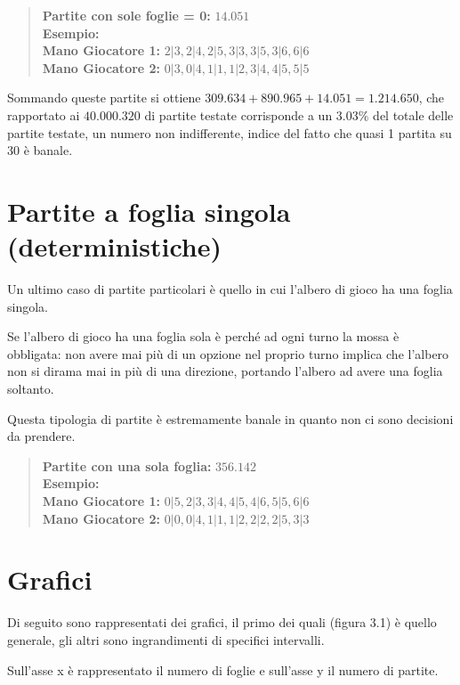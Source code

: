 \documentclass[a4paper,12pt]{report}
\begin{document}
\begin{quote}
    \textbf{Partite con sole foglie = 0:} \(14.051 \)\\
    \textbf{Esempio:} \(\)\\
    \textbf{Mano Giocatore 1:} \(2|3, 2|4, 2|5, 3|3, 3|5, 3|6, 6|6\)\\
    \textbf{Mano Giocatore 2:} \(0|3, 0|4, 1|1, 1|2, 3|4, 4|5, 5|5\)
\end{quote}

Sommando queste partite si ottiene \(309.634 + 890.965 + 14.051 = 1.214.650 \), che rapportato ai \( 40.000.320 \) di partite testate corrisponde a un \( 3.03 \% \) del totale delle partite testate, un numero non indifferente, indice del fatto che quasi 1 partita su 30 è banale.


\section{Partite a foglia singola (deterministiche)}

Un ultimo caso di partite particolari è quello in cui l'albero di gioco ha una foglia singola.

Se l'albero di gioco ha una foglia sola è perché ad ogni turno la mossa è obbligata: non avere mai più di un opzione nel proprio turno implica che l'albero non si dirama mai in più di una direzione, portando l'albero ad avere una foglia soltanto.

Questa tipologia di partite è estremamente banale in quanto non ci sono decisioni da prendere.

\begin{quote}
    \textbf{Partite con una sola foglia:} \(356.142\)\\
    \textbf{Esempio:} \(\)\\
    \textbf{Mano Giocatore 1:} \(0|5, 2|3, 3|4, 4|5, 4|6, 5|5, 6|6\)\\
    \textbf{Mano Giocatore 2:} \(0|0, 0|4, 1|1, 1|2, 2|2, 2|5, 3|3\)
\end{quote}


\section{Grafici}

Di seguito sono rappresentati dei grafici, il primo dei quali (figura 3.1) è quello generale, gli altri sono ingrandimenti di specifici intervalli.

Sull'asse x è rappresentato il numero di foglie e sull'asse y il numero di partite.
\end{document}
